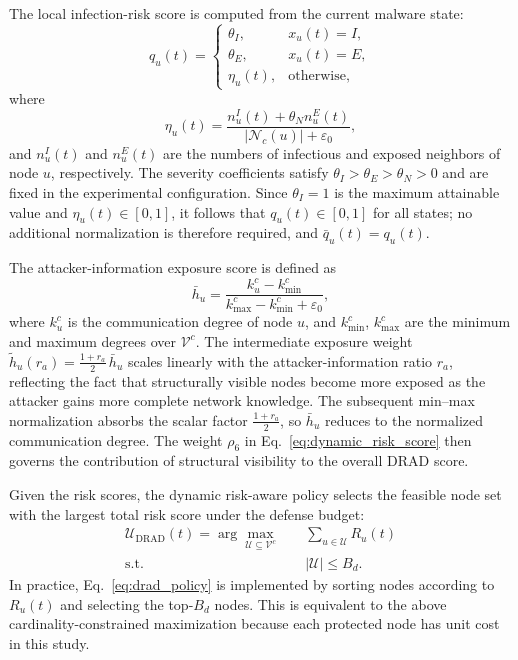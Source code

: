 \documentclass[lettersize,journal]{IEEEtran}
\begin{document}
The local infection-risk score is computed from the current malware state:
\begin{equation}
    q_u(t)=
    \begin{cases}
    \theta_I, & x_u(t)=I,\\
    \theta_E, & x_u(t)=E,\\
    \eta_u(t), & \text{otherwise},
    \end{cases}
    \label{eq:malware_state_risk}
\end{equation}
where
\[
    \eta_u(t)=
    \frac{n_u^{I}(t)+\theta_N n_u^{E}(t)}
    {|\mathcal{N}_{c}(u)|+\varepsilon_0},
\]
and $n_u^{I}(t)$ and $n_u^{E}(t)$ are the numbers of infectious and exposed neighbors of node $u$, respectively. The severity coefficients satisfy $\theta_I>\theta_E>\theta_N>0$ and are fixed in the experimental
configuration. Since $\theta_I=1$ is the maximum attainable value and $\eta_u(t)\in[0,1]$,
it follows that $q_u(t)\in[0,1]$ for all states; no additional normalization is therefore
required, and $\bar{q}_u(t)=q_u(t)$.

The attacker-information exposure score is defined as
\begin{equation}
    \bar{h}_u
    =
    \frac{k_u^{c}-k_{\min}^{c}}{k_{\max}^{c}-k_{\min}^{c}+\varepsilon_0},
    \label{eq:exposure_score}
\end{equation}
where $k_u^{c}$ is the communication degree of node $u$, and $k_{\min}^{c}$,
$k_{\max}^{c}$ are the minimum and maximum degrees over $\mathcal{V}^{c}$.
The intermediate exposure weight $\tilde{h}_u(r_a)=\frac{1+r_a}{2}\,\bar{h}_u$
scales linearly with the attacker-information ratio $r_a$, reflecting the fact
that structurally visible nodes become more exposed as the attacker gains more
complete network knowledge. The subsequent min--max normalization absorbs the
scalar factor $\frac{1+r_a}{2}$, so $\bar{h}_u$ reduces to the normalized
communication degree. The weight $\rho_6$ in Eq.~\eqref{eq:dynamic_risk_score}
then governs the contribution of structural visibility to the overall DRAD score.

Given the risk scores, the dynamic risk-aware policy selects the feasible node set with the largest total risk score under the defense budget:
\begin{equation}
\begin{aligned}
    \mathcal{U}_{\mathrm{DRAD}}(t)
    =
    \arg\max_{\mathcal{U}\subseteq\mathcal{V}^{c}}
    \quad
    &\sum_{u\in\mathcal{U}} R_u(t)\\
    \mathrm{s.t.}
    \quad
    &|\mathcal{U}|\leq B_d .
\end{aligned}
    \label{eq:drad_policy}
\end{equation}
In practice, Eq.~\eqref{eq:drad_policy} is implemented by sorting nodes according to $R_u(t)$ and selecting the top-$B_d$ nodes. This is equivalent to the above cardinality-constrained maximization because each protected node has unit cost in this study.
\end{document}
